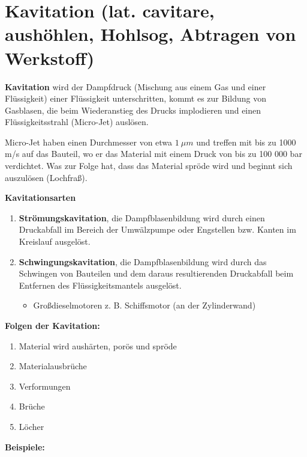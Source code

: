 \section{Kavitation (lat. cavitare, aushöhlen, Hohlsog, Abtragen von
Werkstoff)}\label{kavitation-lat.-cavitare-aushoehlen-hohlsog-abtragen-von-werkstoff}

\textbf{Kavitation} wird der Dampfdruck (Mischung aus einem Gas und
einer Flüssigkeit) einer Flüssigkeit unterschritten, kommt es zur
Bildung von Gasblasen, die beim Wiederanstieg des Drucks implodieren und
einen Flüssigkeitsstrahl (Micro-Jet) auslösen.

Micro-Jet haben einen Durchmesser von etwa $1~\mu m$ und treffen mit
bis zu 1000 m/s auf das Bauteil, wo er das Material mit einem Druck von
bis zu 100 000 bar verdichtet. Was zur Folge hat, dass das Material
spröde wird und beginnt sich auszulösen (Lochfraß).

\textbf{Kavitationsarten}

\begin{enumerate}
\item
  \textbf{Strömungskavitation}, die Dampfblasenbildung wird durch einen
  Druckabfall im Bereich der Umwälzpumpe oder Engstellen bzw. Kanten im
  Kreislauf ausgelöst.
\item
  \textbf{Schwingungskavitation}, die Dampfblasenbildung wird durch das
  Schwingen von Bauteilen und dem daraus resultierenden Druckabfall beim
  Entfernen des Flüssigkeitsmantels ausgelöst.

  \begin{itemize}
  \item
    Großdieselmotoren z. B. Schiffsmotor (an der Zylinderwand)
  \end{itemize}
\end{enumerate}

\textbf{Folgen der Kavitation:}

\begin{enumerate}
\item
  Material wird aushärten, porös und spröde
\item
  Materialausbrüche
\item
  Verformungen
\item
  Brüche
\item
  Löcher
\end{enumerate}

\textbf{Beispiele:}

